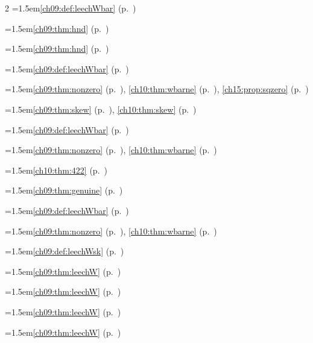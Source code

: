 \begin{multicols}{2}
\hangindent=1.5em\quad \ref{ch09:def:leechWbar} (p.~\pageref{ch09:def:leechWbar})\par
\hangindent=1.5em\quad \ref{ch09:thm:hnd} (p.~\pageref{ch09:thm:hnd})\par
\hangindent=1.5em\quad \ref{ch09:thm:hnd} (p.~\pageref{ch09:thm:hnd})\par
\hangindent=1.5em\quad \ref{ch09:def:leechWbar} (p.~\pageref{ch09:def:leechWbar})\par
\hangindent=1.5em\quad \ref{ch09:thm:nonzero} (p.~\pageref{ch09:thm:nonzero}), \ref{ch10:thm:wbarne} (p.~\pageref{ch10:thm:wbarne}), \ref{ch15:prop:sqzero} (p.~\pageref{ch15:prop:sqzero})\par
\hangindent=1.5em\quad \ref{ch09:thm:skew} (p.~\pageref{ch09:thm:skew}), \ref{ch10:thm:skew} (p.~\pageref{ch10:thm:skew})\par
\hangindent=1.5em\quad \ref{ch09:def:leechWbar} (p.~\pageref{ch09:def:leechWbar})\par
\hangindent=1.5em\quad \ref{ch09:thm:nonzero} (p.~\pageref{ch09:thm:nonzero}), \ref{ch10:thm:wbarne} (p.~\pageref{ch10:thm:wbarne})\par
\hangindent=1.5em\quad \ref{ch10:thm:422} (p.~\pageref{ch10:thm:422})\par
\hangindent=1.5em\quad \ref{ch09:thm:genuine} (p.~\pageref{ch09:thm:genuine})\par
\hangindent=1.5em\quad \ref{ch09:def:leechWbar} (p.~\pageref{ch09:def:leechWbar})\par
\hangindent=1.5em\quad \ref{ch09:thm:nonzero} (p.~\pageref{ch09:thm:nonzero}), \ref{ch10:thm:wbarne} (p.~\pageref{ch10:thm:wbarne})\par
\hangindent=1.5em\quad \ref{ch09:def:leechWsk} (p.~\pageref{ch09:def:leechWsk})\par
\hangindent=1.5em\quad \ref{ch09:thm:leechW} (p.~\pageref{ch09:thm:leechW})\par
\hangindent=1.5em\quad \ref{ch09:thm:leechW} (p.~\pageref{ch09:thm:leechW})\par
\hangindent=1.5em\quad \ref{ch09:thm:leechW} (p.~\pageref{ch09:thm:leechW})\par
\hangindent=1.5em\quad \ref{ch09:thm:leechW} (p.~\pageref{ch09:thm:leechW})\par

\end{multicols}
